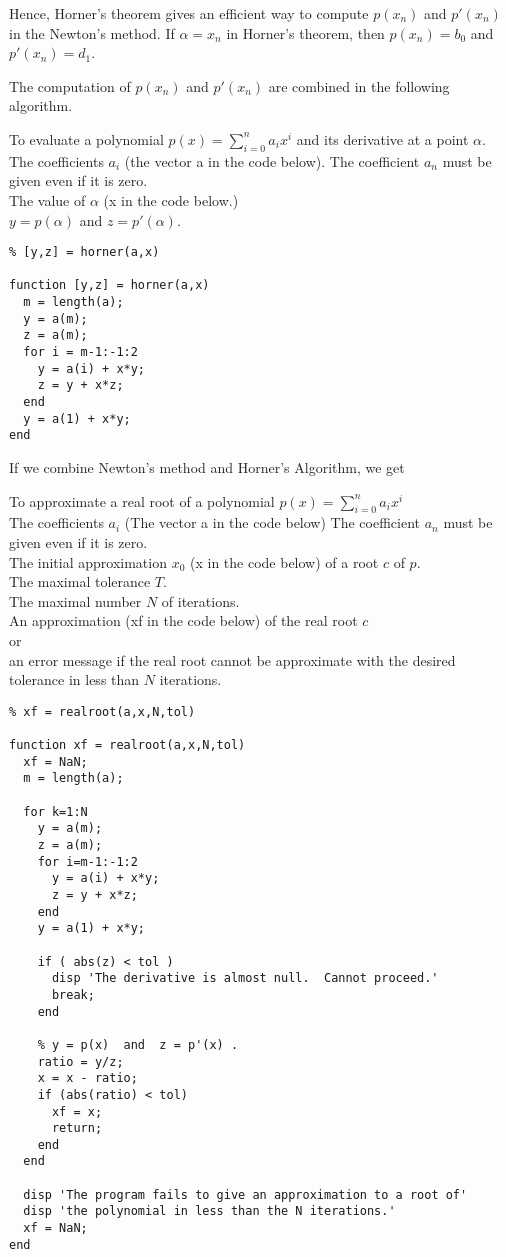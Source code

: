 Hence, Horner's theorem gives an efficient way to compute $p(x_n)$ and
$p'(x_n)$ in the Newton's method.  If $\alpha = x_n$ in Horner's
theorem, then $p(x_n) = b_0$ and $p'(x_n) = d_1$.

The computation of $p(x_n)$ and $p'(x_n)$ are combined in the
following algorithm.

\begin{code}
To evaluate a polynomial $\displaystyle p(x) = \sum_{i=0}^n a_i x^i$
and its derivative at a point $\alpha$.\\
 The coefficients $a_i$ (the vector a in the code below).
The coefficient $a_n$ must be given even if it is zero.\\
The value of $\alpha$ (x in the code below.)\\
 $y = p(\alpha)$ and $z = p'(\alpha)$.
\small
\begin{verbatim}
% [y,z] = horner(a,x)

function [y,z] = horner(a,x)
  m = length(a);
  y = a(m);
  z = a(m);
  for i = m-1:-1:2
    y = a(i) + x*y;
    z = y + x*z;
  end
  y = a(1) + x*y;
end
\end{verbatim}
\end{code}

If we combine Newton's method and Horner's Algorithm, we get

\begin{code}
To approximate a real root of a polynomial
$\displaystyle p(x) = \sum_{i=0}^n a_i x^i$\\
 The coefficients $a_i$ (The vector a in the code below)
The coefficient $a_n$ must be given even if it is zero.\\
The initial approximation $x_0$ (x in the code below) of a root
$c$ of $p$.\\
The maximal tolerance $T$.\\
The maximal number $N$ of iterations.\\
 An approximation (xf in the code below) of the
real root $c$\\ or\\
an error message if the real root cannot be approximate with the
desired tolerance in less than $N$ iterations.
\small
\begin{verbatim}
% xf = realroot(a,x,N,tol)

function xf = realroot(a,x,N,tol)
  xf = NaN;
  m = length(a);

  for k=1:N
    y = a(m);
    z = a(m);
    for i=m-1:-1:2
      y = a(i) + x*y;
      z = y + x*z;
    end
    y = a(1) + x*y;

    if ( abs(z) < tol )
      disp 'The derivative is almost null.  Cannot proceed.'
      break;
    end

    % y = p(x)  and  z = p'(x) .
    ratio = y/z;
    x = x - ratio;
    if (abs(ratio) < tol)
      xf = x;
      return;
    end
  end
  
  disp 'The program fails to give an approximation to a root of'
  disp 'the polynomial in less than the N iterations.'
  xf = NaN;
end
\end{verbatim}
\label{NRHorner}
\end{code}


